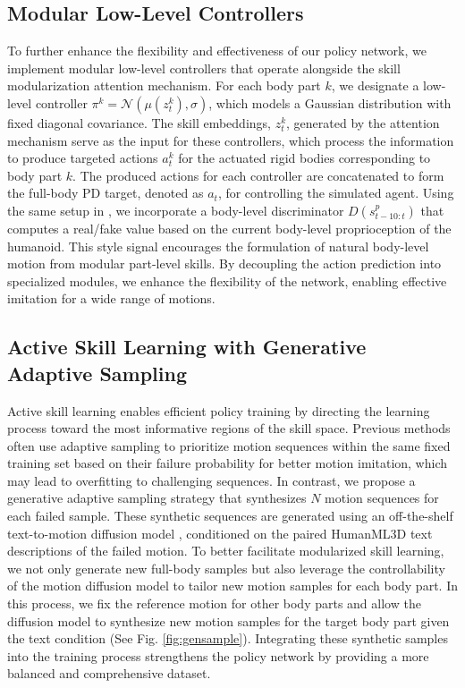 \subsection{Modular Low-Level Controllers}
\label{sec:controller}

To further enhance the flexibility and effectiveness of our policy network, we implement modular low-level controllers that operate alongside the skill modularization attention mechanism. For each body part $k$, we designate a low-level controller $\pi^{k} = \mathcal{N}(\mu(z_{t}^{k}), \sigma)$, which models a Gaussian distribution with fixed diagonal covariance. The skill embeddings, $z_t^{k}$, generated by the attention mechanism serve as the input for these controllers, which process the information to produce targeted actions $a_t^{k}$ for the actuated rigid bodies corresponding to body part $k$. The produced actions for each controller are concatenated to form the full-body PD target, denoted as $a_{t}$, for controlling the simulated agent. Using the same setup in \cite{10.1145/3450626.3459670}, we incorporate a body-level discriminator $D(s^{p}_{t-10:t})$ that computes a real/fake value based on the current body-level proprioception of the humanoid. This style signal encourages the formulation of natural body-level motion from modular part-level skills. By decoupling the action prediction into specialized modules, we enhance the flexibility of the network, enabling effective imitation for a wide range of motions.

\subsection{Active Skill Learning with Generative Adaptive Sampling}
\label{sec:generative}

Active skill learning enables efficient policy training by directing the learning process toward the most informative regions of the skill space. Previous methods \cite{Luo2023PerpetualHC, luo2024universal} often use adaptive sampling to prioritize motion sequences within the same fixed training set based on their failure probability for better motion imitation, which may lead to overfitting to challenging sequences. In contrast, we propose a generative adaptive sampling strategy that synthesizes $N$ motion sequences for each failed sample. These synthetic sequences are generated using an off-the-shelf text-to-motion diffusion model \cite{tevet2023human}, conditioned on the paired HumanML3D text descriptions \cite{Guo_2022_CVPR} of the failed motion. To better facilitate modularized skill learning, we not only generate new full-body samples but also leverage the controllability of the motion diffusion model to tailor new motion samples for each body part. In this process, we fix the reference motion for other body parts and allow the diffusion model to synthesize new motion samples for the target body part given the text condition (See Fig. \ref{fig:gensample}). Integrating these synthetic samples into the training process strengthens the policy network by providing a more balanced and comprehensive dataset. 

